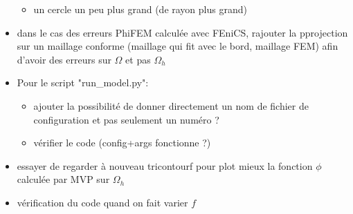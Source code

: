 \documentclass{article}
\begin{document}
\begin{itemize}[label=$\square$]
\begin{itemize}
			\item un cercle un peu plus grand (de rayon plus grand) 
		\end{itemize}
		\item dans le cas des erreurs PhiFEM calculée avec FEniCS, rajouter la pprojection sur un maillage conforme (maillage qui fit avec le bord, maillage FEM) afin d'avoir des erreurs sur $\Omega$ et pas $\Omega_h$
		\item Pour le script "run\_model.py":
		\begin{itemize}
			\item ajouter la possibilité de donner directement un nom de fichier de configuration et pas seulement un numéro ?
			\item vérifier le code (config+args fonctionne ?)
		\end{itemize}
		\item essayer de regarder à nouveau tricontourf pour plot mieux la fonction $\phi$ calculée par MVP sur $\Omega_h$
		\item vérification du code quand on fait varier $f$
	\end{itemize}
\end{document}
